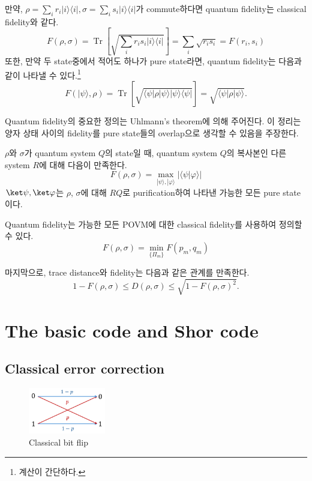 만약, $\rho=\sum_i r_i|i\rangle\langle i|, \sigma=\sum_i s_i|i\rangle\langle i|$가 commute하다면 quantum fidelity는 classical fidelity와 같다.
\begin{equation*}
    F(\rho, \sigma)=\operatorname{Tr}\left[\sqrt{\sum_i r_i s_i|i\rangle\langle i|}\right]=\sum_i \sqrt{r_i s_i}=F\left(r_i, s_i\right)
\end{equation*}
또한, 만약 두 state중에서 적어도 하나가 pure state라면, quantum fidelity는 다음과 같이 나타낼 수 있다.\footnote{계산이 간단하다.}
\begin{equation*}
    F(|\psi\rangle, \rho)=\operatorname{Tr}[\sqrt{\langle\psi| \rho|\psi\rangle|\psi\rangle\langle\psi|}]=\sqrt{\langle\psi| \rho|\psi\rangle} .
\end{equation*}

Quantum fidelity의 중요한 정의는 Uhlmann's theorem에 의해 주어진다. 이 정리는 양자 상태 사이의 fidelity를 pure state들의 overlap으로 생각할 수 있음을 주장한다.
\begin{theorem}
    $\rho$와 $\sigma$가 quantum system $Q$의 state일 때, quantum system $Q$의 복사본인 다른 system $R$에 대해 다음이 만족한다.
    $$ F(\rho, \sigma)=\max _{|\psi\rangle,|\varphi\rangle}|\langle\psi | \varphi\rangle| $$
    $\ket \psi, \ket \varphi$는 $\rho$, $\sigma$에 대해 $RQ$로 purification하여 나타낸 가능한 모든 pure state이다.
\end{theorem}

Quantum fidelity는 가능한 모든 POVM에 대한 classical fidelity를 사용하여 정의할 수 있다.
\begin{equation*}
    F(\rho, \sigma)=\min_{\{\Pi_m\}} F\left(p_m, q_m\right)
\end{equation*}

마지막으로, trace distance와 fidelity는 다음과 같은 관계를 만족한다.
\begin{equation*}
    1-F(\rho, \sigma) \leq D(\rho, \sigma) \leq \sqrt{1-F(\rho, \sigma)^2} .
\end{equation*}

\section{The basic code and Shor code}
\subsection{Classical error correction}
\begin{figure}
    \centering
    \includegraphics[width=0.3\textwidth]{figures/classical-bit-flip.pdf}
    \caption{Classical bit flip}
    \label{fig:bit-flip}
\end{figure}

